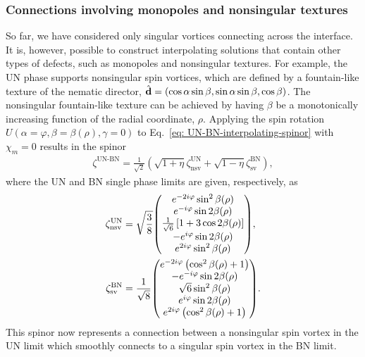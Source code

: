 \subsubsection{Connections involving monopoles and nonsingular textures}
So far, we have considered only singular vortices connecting across the
interface.
It is, however, possible to construct interpolating solutions that contain
other types of defects, such as monopoles and nonsingular textures.
For example, the UN phase supports nonsingular spin vortices, which are defined
by a fountain-like texture of the nematic director, \(\hat{\vb{d}} =
(\cos\alpha\sin\beta, \sin\alpha\sin\beta, \cos\beta)\).
The nonsingular fountain-like texture can be achieved by having \(\beta\) be a
monotonically increasing function of the radial coordinate, \(\rho\).
Applying the spin rotation \(U(\alpha=\varphi, \beta=\beta(\rho), \gamma=0)\) to
Eq.~\eqref{eq: UN-BN-interpolating-spinor} with \(\chi_m=0\) results in the
spinor
\begin{align}\label{eq: UN-BN-nsv-sv}
    \zeta^\text{UN-BN}=\frac{1}{\sqrt{2}}\left(
        \sqrt{1+\eta}\zeta^\text{UN}_\text{nsv} + 
        \sqrt{1-\eta}\zeta^\text{BN}_\text{sv}
        \right),
\end{align}
where the UN and BN single phase limits are given, respectively, as
\begin{align}\label{eq: UN-general}
    \zeta^\text{UN}_\text{nsv} &= \sqrt{\frac{3}{8}}
    \mqty(
        e^{-2i\varphi}\sin^2\beta(\rho) \\
        e^{-i\varphi}\sin 2 \beta(\rho) \\
        \frac{1}{\sqrt{6}}\left[1+3\cos 2\beta(\rho)\right] \\
        -e^{i\varphi} \sin 2 \beta(\rho) \\
        e^{2i\varphi}\sin^2\beta(\rho)
    ), \\
    \zeta^\text{BN}_\text{sv} &= \frac{1}{\sqrt{8}} \label{eq: BN-general}
    \mqty(
        e^{-2i\varphi}\left(\cos^2\beta(\rho) + 1\right) \\
        - e^{-i\varphi}\sin 2 \beta(\rho) \\
        \sqrt{6}\sin^2\beta(\rho) \\
        e^{i\varphi}\sin 2 \beta(\rho) \\
        e^{2i\varphi}\left(\cos^2\beta(\rho) + 1\right)          
    ).
\end{align}
This spinor now represents a connection between a nonsingular spin vortex in the
UN limit which smoothly connects to a singular spin vortex in the BN limit.

